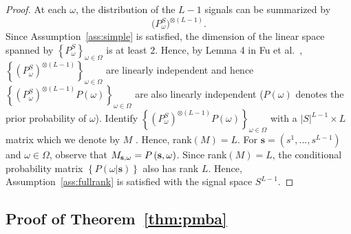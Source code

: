 \documentclass[12pt,reqno]{amsart}
\begin{document}
\begin{proof}
At each $\omega$, the distribution of the $L-1$ signals can be summarized by
\[
\big(P_{\omega}^{S}\big)^{\otimes (L-1)}.
\]
Since Assumption~\ref{ass:simple} is satisfied, the dimension of the linear space spanned by $\left\{
P_{\omega }^{S}\right\} _{\omega \in \Omega }$ is at least $2$. Hence, by
Lemma 4 in Fu et al.~\citeyearpar{fu2021full}, $\left\{(P_{\omega }^{S})^{\otimes (L-1)}\right\}_{\omega \in \Omega }$ are
linearly independent and hence $\left\{ (P_{\omega}^{S})^{\otimes (L-1)}P\left( \omega \right) \right\}_{\omega \in \Omega }$
are also linearly independent ($P\left( \omega \right) $ denotes the prior
probability of $\omega $). Identify $\left\{ (P_{\omega}^{S})^{\otimes (L-1)}P\left( \omega \right) \right\} _{\omega \in \Omega }$
with a $\left\vert S\right\vert ^{L-1}\times L$ matrix which we denote by $M$%
. Hence, rank$\left( M\right) =L$. For $\mathbf{s}=\left(
s^{1},\ldots,s^{L-1}\right) $ and $\omega \in \Omega $, observe that $M_{%
\mathbf{s},\omega}=P\left( \mathbf{s},\omega \right) $. Since rank$\left(
M\right) =L$, the conditional probability matrix $\left\{ P\left( \omega |%
\mathbf{s}\right) \right\}$ also has rank $L$. Hence, Assumption~\ref{ass:fullrank} is satisfied with
the signal space $S^{L-1}$.
\end{proof}



\subsection{Proof of Theorem~\ref{thm:pmba}}
\end{document}
